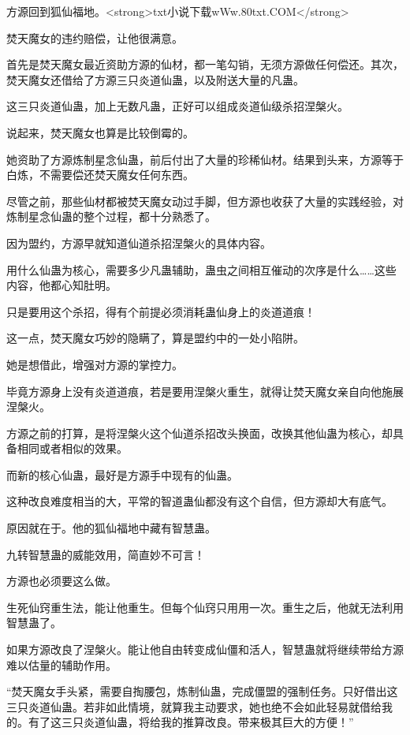 
\begin{this_body}

方源回到狐仙福地。<strong>txt小说下载wWw.80txt.COM</strong>

焚天魔女的违约赔偿，让他很满意。

首先是焚天魔女最近资助方源的仙材，都一笔勾销，无须方源做任何偿还。其次，焚天魔女还借给了方源三只炎道仙蛊，以及附送大量的凡蛊。

这三只炎道仙蛊，加上无数凡蛊，正好可以组成炎道仙级杀招涅槃火。

说起来，焚天魔女也算是比较倒霉的。

她资助了方源炼制星念仙蛊，前后付出了大量的珍稀仙材。结果到头来，方源等于白炼，不需要偿还焚天魔女任何东西。

尽管之前，那些仙材都被焚天魔女动过手脚，但方源也收获了大量的实践经验，对炼制星念仙蛊的整个过程，都十分熟悉了。

因为盟约，方源早就知道仙道杀招涅槃火的具体内容。

用什么仙蛊为核心，需要多少凡蛊辅助，蛊虫之间相互催动的次序是什么……这些内容，他都心知肚明。

只是要用这个杀招，得有个前提必须消耗蛊仙身上的炎道道痕！

这一点，焚天魔女巧妙的隐瞒了，算是盟约中的一处小陷阱。

她是想借此，增强对方源的掌控力。

毕竟方源身上没有炎道道痕，若是要用涅槃火重生，就得让焚天魔女亲自向他施展涅槃火。

方源之前的打算，是将涅槃火这个仙道杀招改头换面，改换其他仙蛊为核心，却具备相同或者相似的效果。

而新的核心仙蛊，最好是方源手中现有的仙蛊。

这种改良难度相当的大，平常的智道蛊仙都没有这个自信，但方源却大有底气。

原因就在于。他的狐仙福地中藏有智慧蛊。

九转智慧蛊的威能效用，简直妙不可言！

方源也必须要这么做。

生死仙窍重生法，能让他重生。但每个仙窍只用用一次。重生之后，他就无法利用智慧蛊了。

如果方源改良了涅槃火。能让他自由转变成仙僵和活人，智慧蛊就将继续带给方源难以估量的辅助作用。

“焚天魔女手头紧，需要自掏腰包，炼制仙蛊，完成僵盟的强制任务。只好借出这三只炎道仙蛊。若非如此情境，就算我主动要求，她也绝不会如此轻易就借给我的。有了这三只炎道仙蛊，将给我的推算改良。带来极其巨大的方便！”


\end{this_body}
